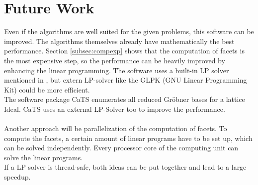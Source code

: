 \section{Future Work}
Even if the algorithms are well suited for the given problems, this software can be improved.
The algorithms themselves already have mathematically the best performance. 
Section \ref{subsec:compexp} shows that the computation of facets is the most expensive step, so the performance can be heavily improved by enhancing the linear programming.
The software uses a built-in LP solver mentioned in \cite{tigers}, but extern LP-solver like the GLPK (GNU Linear Programming Kit) could be more efficient. \\
The software package CaTS \cite{cats} enumerates all reduced Gröbner bases for a lattice Ideal. CaTS uses an external LP-Solver too to improve the performance.
\\\\
Another approach will be parallelization of the computation of facets. To compute the facets, a certain amount of linear programs have to be set up, which can be solved independently. Every processor core of the computing unit can solve the linear programs.\\
If a LP solver is thread-safe, both ideas can be put together and lead to a large speedup. 

\newpage